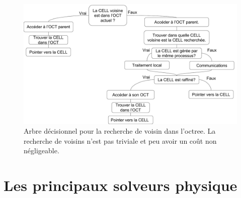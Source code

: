 \begin{figure}[bth]
        \includegraphics[width=.95\linewidth]{img/02/voisins.pdf} 
        \caption[Recherche de voisin dans l'octree.]{Arbre décisionnel pour la recherche de voisin dans l'octree.
        La recherche de voisins n'est pas triviale et peu avoir un coût non négligeable.
     	\label{fig:voisin} }
\end{figure}

%
%



\chapter{Les principaux solveurs physique}
\label{sec:solvers}

